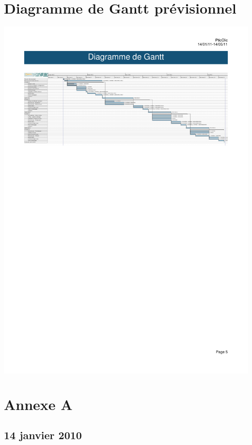 \documentclass[a4paper,11pt,french]{article}
\begin{document}
\newpage

\appendix

\section{Diagramme de Gantt prévisionnel}
\label{sec:gantt-original}
\noindent
\hskip -2.6cm%
\includegraphics[trim=1.7cm 19cm 1.7cm 4cm,clip,width=20cm]{../feuille-route/gp-pticlic.pdf}
\newpage

\section{Annexe A}


\subsection{14 janvier 2010}
\end{document}

